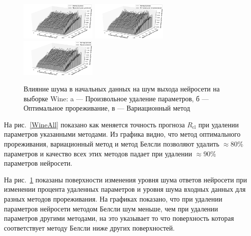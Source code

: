 \begin{figure}[ht]\center
\includegraphics[width=0.33\textwidth]{plots/grabovoy/wine_random_noise3d.pdf}
{\includegraphics[width=0.33\textwidth]{plots/grabovoy/obd_noise_3d.pdf}}
{\includegraphics[width=0.33\textwidth]{plots/grabovoy/var_noise_3d.pdf}}

\caption{Влияние шума в начальных данных на шум выхода нейросети на выборке Wine: a --- Произвольное удаление параметров, б --- Оптимальное прореживание, в --- Вариационный метод}
\label{WineNoise}
\end{figure}

На рис.~\ref{WineAll} показано как меняется точность прогноза $R_{\text{cl}}$ при удалении параметров указанными методами. Из графика видно, что метод оптимального прореживания, вариационный метод и метод Белсли позволяют удалить $\approx80\%$ параметров и качество всех этих методов падает при удалении $\approx90\%$ параметров нейросети. 

На рис.~\ref{WineNoise} показаны поверхности изменения уровня шума ответов нейросети при изменении процента удаленных параметров и уровня шума входных данных для разных методов прореживания. На графиках показано, что при удалении параметров нейросети методом Белсли шум меньше, чем при удалении параметров другими методами, на это указывает то что поверхность которая соответствует методу Белсли ниже других поверхностей.

